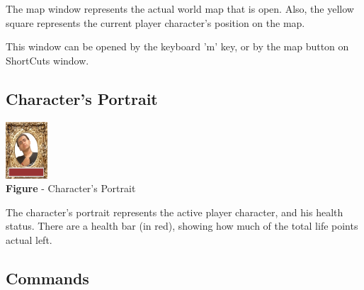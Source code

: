 \documentclass[ letterpaper,12pt]{article}
\begin{document}
The map window represents the actual world map that is open. Also, the yellow square represents the current player character's position on the map. 

This window can be opened by the keyboard 'm' key, or by the map button on ShortCuts window.

\subsection{Character's Portrait}

\begin{center}
  \includegraphics{portrait.png}
\\{\bf Figure} - Character's Portrait
\end{center}

The character's portrait represents the active player character, and his health status. There are a health bar (in red), showing how much of the total life points actual left.

\subsection{Commands}
\end{document}
